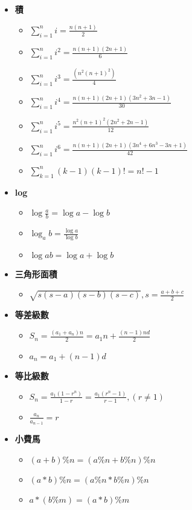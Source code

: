 \begin{itemize}
  \item \textbf{積}
  \begin{itemize}
    \item $\sum \limits_{i=1}^n i = \frac{n(n+1)}{2}$
    \item $\sum \limits_{i=1}^n i^2 = \frac{n(n+1)(2n+1)}{6}$
    \item $\sum \limits_{i=1}^n i^3 = \frac{(n^2(n+1)^2)}{4}$
    \item $\sum \limits_{i=1}^n i^4 = \frac{n(n+1)(2n+1)(3n^2+3n-1)}{30}$
    \item $\sum \limits_{i=1}^n i^5 = \frac{n^2(n+1)^2(2n^2+2n-1)}{12}$
    \item $\sum \limits_{i=1}^n i^6 = \frac{n(n+1)(2n+1)(3n^4+6n^3-3n+1)}{42}$
    \item $\sum \limits_{k=1}^n (k-1)(k-1)! = n!-1$
  \end{itemize}
  
  \item \textbf{log}
  \begin{itemize}
    \item $\log\frac{a}{b} = \log a - \log b$
    \item $\log_a b = \frac{\log a}{\log b}$
    \item $\log ab = \log a + \log b$
  \end{itemize}
  
  \item \textbf{三角形面積}
  \begin{itemize}
    \item $\sqrt{s(s-a)(s-b)(s-c)}, s = \frac{a+b+c}{2}$
  \end{itemize}
  
  \item \textbf{等差級數}
  \begin{itemize}
    \item $S_n = \frac{(a_1 + a_n)n}{2} = a_1n + \frac{(n-1)nd}{2}$
    \item $a_n = a_1 + (n-1)d$
  \end{itemize}
  
  \item \textbf{等比級數}
  \begin{itemize}
    \item $S_n = \frac{a_1(1-r^n)}{1-r} = \frac{a_1(r^n-1)}{r-1}, (r \neq 1)$
    \item $\frac{a_n}{a_{n-1}} = r$
  \end{itemize}
  
  \item \textbf{小費馬}
  \begin{itemize}
    \item $(a+b)\%n = (a\%n+b\%n)\%n$
    \item $(a*b)\%n = (a\%n*b\%n)\%n$
    \item $a*(b\%m) = (a*b)\%m$
  \end{itemize}
\end{itemize}

